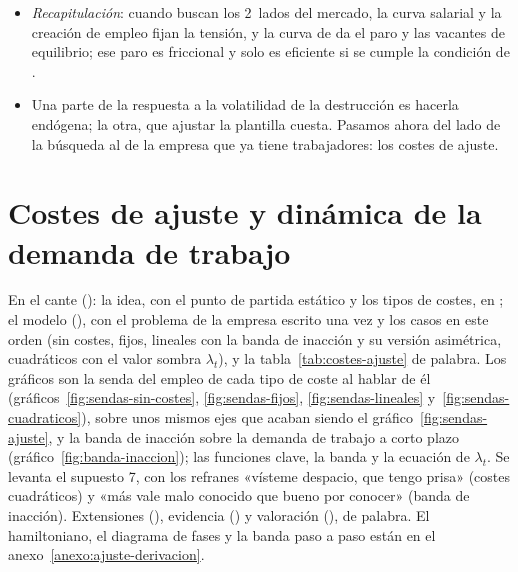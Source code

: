 \documentclass[11pt]{article}
\begin{document}
\begin{itemize}
\begin{itemize}
  \item explica mal el paro de larga duración y su persistencia ;
  \item con separaciones exógenas, no explica que en las recesiones el empleo caiga sobre todo porque se destruyen puestos, más que porque se creen menos: la destrucción de empleo es más volátil que la creación\nocite{DavisHaltiwanger1992Gross}.
  \end{itemize}
\item \emph{Recapitulación}: cuando buscan los 2~lados del mercado, la curva salarial y la creación de empleo fijan la tensión, y la curva de  da el paro y las vacantes de equilibrio; ese paro es friccional y solo es eficiente si se cumple la condición de .
\item Una parte de la respuesta a la volatilidad de la destrucción es hacerla endógena; la otra, que ajustar la plantilla cuesta. Pasamos ahora del lado de la búsqueda al de la empresa que ya tiene trabajadores: los costes de ajuste.
\end{itemize}


\section{Costes de ajuste y dinámica de la demanda de trabajo}\label{sec:costes-ajuste}

\begin{notaopositor}
En el cante (): la idea, con el punto de partida estático y los tipos de costes, en ; el modelo (), con el problema de la empresa escrito una vez y los casos en este orden (sin costes, fijos, lineales con la banda de inacción y su versión asimétrica, cuadráticos con el valor sombra $\lambda_t$), y la tabla~\ref{tab:costes-ajuste} de palabra. Los gráficos son la senda del empleo de cada tipo de coste al hablar de él (gráficos~\ref{fig:sendas-sin-costes}, \ref{fig:sendas-fijos}, \ref{fig:sendas-lineales} y~\ref{fig:sendas-cuadraticos}), sobre unos mismos ejes que acaban siendo el gráfico~\ref{fig:sendas-ajuste}, y la banda de inacción sobre la demanda de trabajo a corto plazo (gráfico~\ref{fig:banda-inaccion}); las funciones clave, la banda y la ecuación de $\lambda_t$. Se levanta el supuesto 7, con los refranes «vísteme despacio, que tengo prisa» (costes cuadráticos) y «más vale malo conocido que bueno por conocer» (banda de inacción). Extensiones (), evidencia () y valoración (), de palabra. El hamiltoniano, el diagrama de fases y la banda paso a paso están en el anexo~\ref{anexo:ajuste-derivacion}.
\end{notaopositor}
\end{document}
